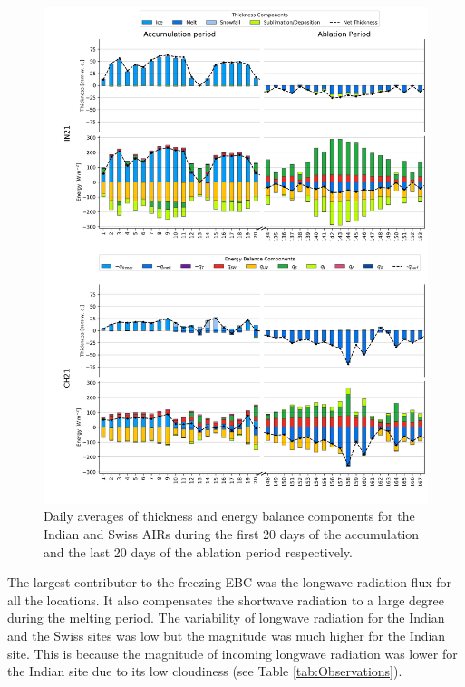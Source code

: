 \documentclass[utf8]{frontiersSCNS} %
\begin{document}
\begin{figure}
	\begin{center}
		\includegraphics[width=\linewidth]{Figures/mass_energy_bal.jpg} \end{center}
	\caption{Daily averages of thickness and energy balance components for the Indian and Swiss AIRs during the
		first 20 days of the accumulation and the last 20 days of the ablation period respectively.  } \label{fig:MEB}
\end{figure}

The largest contributor to the freezing EBC was the longwave radiation flux for all the locations.  It also
compensates the shortwave radiation to a large degree during the melting period. The variability of longwave
radiation for the Indian and the Swiss sites was low but the magnitude was much higher for the Indian site. This
is because the  magnitude of incoming longwave radiation was lower for the Indian site due to its low cloudiness
(see Table \ref{tab:Observations}).
\end{document}

